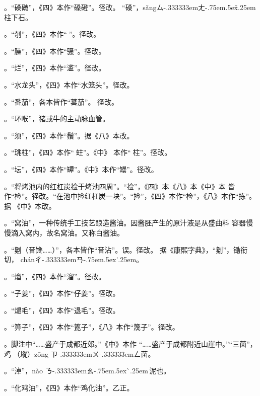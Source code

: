 \begin{list}{}
。“磉礅”，《四》本作“磉磴”。径改。
“磉”，{s\v{a}ng}{ㄙ\kern-.333333emㄤ\kern-.75em\raise.5ex\hbox{\v{}}\kern.25em}
柱下石。

。“剞”，《四》本作“𠟤”。径改。

。“臊”，《四》本作“骚”。径改。

。“烂”，《四》本作“滥”。径改。

。“水龙头”，《四》本作“水笼头”。径改。

。“番茄”，各本皆作“蕃茄”。
径改。

。“环喉”，猪或牛的主动脉血管。

。“须”，《四》本作“鬚”。据《八》本改。

。“珧柱”，《四》本作“𧎼蛀”。《中》
本作“𧎼柱”。径改。

。“坛”，《四》本作“罈”。《中》本作“罎”。径改。

。“将烤池内的红杠炭捡于烤池四周”。“捡”，《四》本《八》本《中》本
皆作“检”。径改。“在池中捡红杠炭一块”。“捡”，《四》本作“检”，《八》本作“拣”。据
《中》本改。

。“窝油”，一种传统手工技艺酿造酱油。因酱胚产生的原汁液是从盛曲料
容器慢慢滴入窝内，故名窝油。又称白酱油。

。“劖（音馋……）”，各本皆作“音沾”。误。径改。
据《康熙字典》，“劖”，锄衔切，
{ch\'{a}n}{ㄔ\kern-.333333emㄢ\kern-.75em\raise.5ex\hbox{\'{}}\kern.25em}。

。“熘”，《四》本作“溜”。径改。

。“子姜”，《四》本作“仔姜”。径改。

。“煺毛”，《四》本作“退毛”。径改。

。“箅子”，《四》本作“篦子”，《八》本作“篾子”。径改。

。脚注{\footnotesize{}}中“……盛产于成都近郊。”《中》本作
“……盛产于成都附近山崖中。”“三菌”，鸡𭎂（㙡）{z\={o}ng}%
{ㄗ\kern-.333333emㄨ\kern-.333333emㄥ}菌。

。“淖”，{n\`{a}o}%
{ㄋ\kern-.333333emㄠ\kern-.75em\raise.5ex\hbox{\`{}}\kern.25em}\,泥也。

。“化鸡油”，《四》本作“鸡化油”。乙正。


\end{list}
